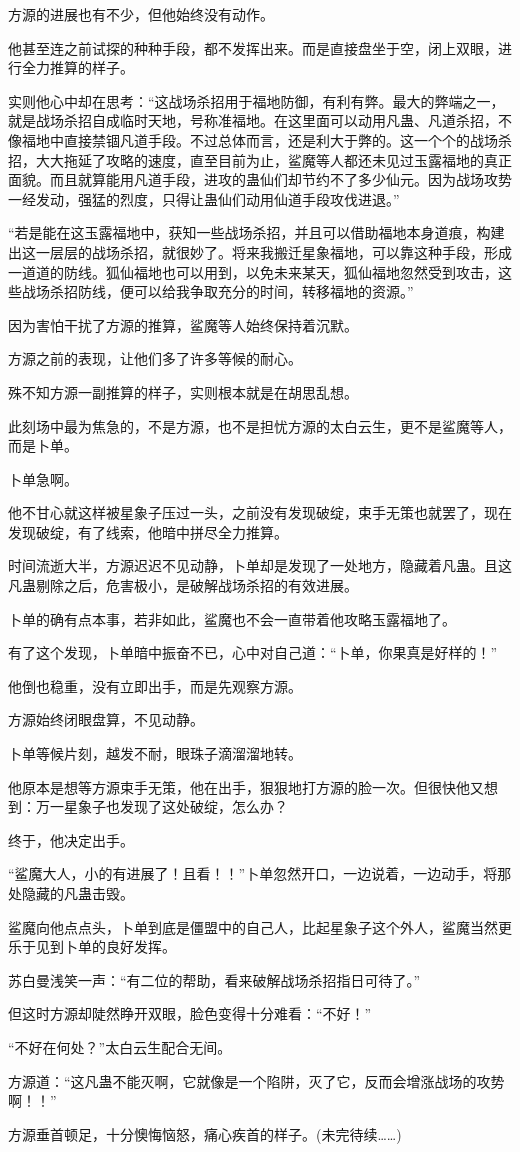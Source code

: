 \begin{this_body}
方源的进展也有不少，但他始终没有动作。

他甚至连之前试探的种种手段，都不发挥出来。而是直接盘坐于空，闭上双眼，进行全力推算的样子。

实则他心中却在思考：“这战场杀招用于福地防御，有利有弊。最大的弊端之一，就是战场杀招自成临时天地，号称准福地。在这里面可以动用凡蛊、凡道杀招，不像福地中直接禁锢凡道手段。不过总体而言，还是利大于弊的。这一个个的战场杀招，大大拖延了攻略的速度，直至目前为止，鲨魔等人都还未见过玉露福地的真正面貌。而且就算能用凡道手段，进攻的蛊仙们却节约不了多少仙元。因为战场攻势一经发动，强猛的烈度，只得让蛊仙们动用仙道手段攻伐进退。”

“若是能在这玉露福地中，获知一些战场杀招，并且可以借助福地本身道痕，构建出这一层层的战场杀招，就很妙了。将来我搬迁星象福地，可以靠这种手段，形成一道道的防线。狐仙福地也可以用到，以免未来某天，狐仙福地忽然受到攻击，这些战场杀招防线，便可以给我争取充分的时间，转移福地的资源。”

因为害怕干扰了方源的推算，鲨魔等人始终保持着沉默。

方源之前的表现，让他们多了许多等候的耐心。

殊不知方源一副推算的样子，实则根本就是在胡思乱想。

此刻场中最为焦急的，不是方源，也不是担忧方源的太白云生，更不是鲨魔等人，而是卜单。

卜单急啊。

他不甘心就这样被星象子压过一头，之前没有发现破绽，束手无策也就罢了，现在发现破绽，有了线索，他暗中拼尽全力推算。

时间流逝大半，方源迟迟不见动静，卜单却是发现了一处地方，隐藏着凡蛊。且这凡蛊剔除之后，危害极小，是破解战场杀招的有效进展。

卜单的确有点本事，若非如此，鲨魔也不会一直带着他攻略玉露福地了。

有了这个发现，卜单暗中振奋不已，心中对自己道：“卜单，你果真是好样的！”

他倒也稳重，没有立即出手，而是先观察方源。

方源始终闭眼盘算，不见动静。

卜单等候片刻，越发不耐，眼珠子滴溜溜地转。

他原本是想等方源束手无策，他在出手，狠狠地打方源的脸一次。但很快他又想到：万一星象子也发现了这处破绽，怎么办？

终于，他决定出手。

“鲨魔大人，小的有进展了！且看！！”卜单忽然开口，一边说着，一边动手，将那处隐藏的凡蛊击毁。

鲨魔向他点点头，卜单到底是僵盟中的自己人，比起星象子这个外人，鲨魔当然更乐于见到卜单的良好发挥。

苏白曼浅笑一声：“有二位的帮助，看来破解战场杀招指日可待了。”

但这时方源却陡然睁开双眼，脸色变得十分难看：“不好！”

“不好在何处？”太白云生配合无间。

方源道：“这凡蛊不能灭啊，它就像是一个陷阱，灭了它，反而会增涨战场的攻势啊！！”

方源垂首顿足，十分懊悔恼怒，痛心疾首的样子。(未完待续……)

\end{this_body}

